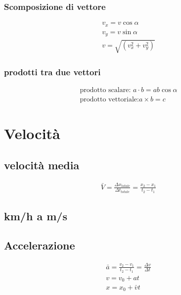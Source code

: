 \documentclass{article}
\begin{document}
\subsubsection{Scomposizione di vettore}
\label{sec:scomposizione}

\begin{eqnarray}
  \label{eq:scompvetto}
  v_x=v\cos \alpha\\
  v_y=v\sin \alpha{}\\
  v=\sqrt{(v_x^2+v_y^2)}
\end{eqnarray}

\subsubsection{prodotti tra due vettori}
\label{sec:prodtraduevett}

\begin{eqnarray}
  \label{eq:prodtraduevett}
  \text{prodotto scalare: }a\cdot b=ab\cos \alpha{}\\
  \text{prodotto vettoriale:}a \times b=c
\end{eqnarray}

\section{Velocità}
\label{sec:velocità}

\subsection{velocità media}
\label{sec:velmedia}


\begin{eqnarray}
  \label{eq:velmedia}
  \bar{V} = \frac{\Delta x_{totale}}{\Delta t_{totale}}=\frac{x_2-x_1}{t_2-t_1}
\end{eqnarray}

\subsection{km/h a m/s}
\label{sec:km/hm/s}

\subsection{Accelerazione}
\label{sec:accelerarzione}

\begin{eqnarray}
  \label{eq:acc}
  \bar{a}=\frac{v_2-v_1}{t_2-t_1}=\frac{\Delta v}{\Delta t}\\
  v=v_0+at\\
  x=x_0+\bar{v} t
\end{eqnarray}
\end{document}
